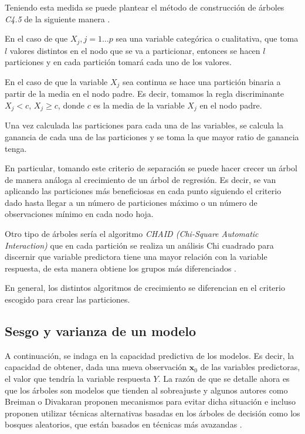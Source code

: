 \noindent Teniendo esta medida se puede plantear el método de construcción de árboles \emph{C4.5}  de la siguiente manera \cite{Loh 2014}.

\noindent En el caso de que $X_j, j=1\ldots p$ sea una variable categórica o cualitativa, que toma $l$ valores distintos en el nodo que se va a particionar, entonces se hacen $l$ particiones y en cada partición tomará cada uno de los valores. 

\noindent En el caso de que la variable $X_j$ sea continua se hace una partición binaria a partir de la media en el nodo padre. Es decir, tomamos la regla discriminante $X_j<c$, $X_j\geq c$, donde $c$ es la media de la variable $X_j$ en el nodo padre. 

\noindent Una vez calculada las particiones para cada una de las variables, se calcula la ganancia de cada una de las particiones y se toma la que mayor ratio de ganancia tenga. 

\noindent En particular, tomando este criterio de separación se puede hacer crecer un árbol de manera análoga al crecimiento de un árbol de regresión. Es decir, se van aplicando las particiones más beneficiosas en cada punto siguiendo el criterio dado hasta llegar a un número de particiones máximo o un número de observaciones mínimo en cada nodo hoja.

\noindent Otro tipo de árboles sería el algoritmo \emph{CHAID (Chi-Square Automatic Interaction)} que en cada partición se realiza un análisis Chi cuadrado para discernir que variable predictora tiene una mayor relación con la variable respuesta, de esta manera obtiene los grupos más diferenciados \cite{Kass 1980}.

\noindent En general, los distintos algoritmos de crecimiento se diferencian en el criterio escogido para crear las particiones. 
   
\subsection{Sesgo y varianza de un modelo}

\noindent A continuación, se indaga en la capacidad predictiva de los modelos. Es decir, la capacidad de obtener, dada una nueva observación $\mathbf{x}_0$ de las variables predictoras, el valor que tendría la variable respuesta $Y$. La razón de que se detalle ahora es que los árboles son modelos que tienden al sobreajuste y algunos autores como Breiman o Divakaran proponen mecanismos para evitar dicha situación e incluso proponen utilizar técnicas alternativas basadas en los árboles de decisión como los  bosques aleatorios, que están basados en técnicas más avazandas \cite{Breiman 1984, Breiman 2001,Divakaran 2022, Hartigan 1975}. 



